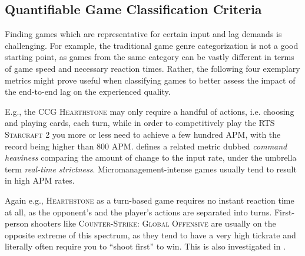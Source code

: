 


\subsection{Quantifiable Game Classification Criteria}


Finding games which are representative for certain input and lag demands is challenging.
For example, the traditional game genre categorization is not a good starting point, as games from the same category can be vastly different in terms of game speed and necessary reaction times.
Rather, the following four exemplary metrics might prove useful when classifying games to better assess the impact of the end-to-end lag on the experienced quality.

 E.g., the \gls{CCG} \textsc{Hearthstone} may only require a handful of actions, i.e. choosing and playing cards, each turn, while in order to competitively play the \gls{RTS} \textsc{Starcraft 2} you more or less need to achieve a few hundred \gls{APM}, with the record being higher than $800$ \gls{APM}. \cite{6404025} defines a related metric dubbed \textit{command heaviness} comparing the amount of change to the input rate, under the umbrella term \textit{real-time strictness}. %
    Micromanagement-intense games usually tend to result in high APM rates.

 Again e.g., \textsc{Hearthstone} as a turn-based game requires no instant reaction time at all, as the opponent's and the player's actions are separated into turns. First-person shooters like \textsc{Counter-Strike: Global Offensive} are usually on the opposite extreme of this spectrum, as they tend to have a very high tickrate and literally often require you to ``shoot first'' to win. This is also investigated in \cite{Claypool:2006:LPA:1167838.1167860}.

